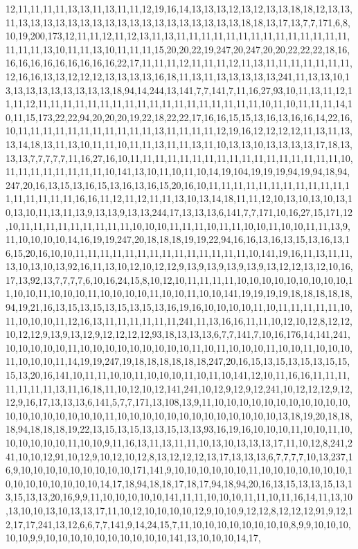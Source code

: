 12,11,11,11,11,13,13,11,13,11,11,12,19,16,14,13,13,13,12,13,12,13,13,18,18,12,13,13,11,13,13,13,13,13,13,13,13,13,13,13,13,13,13,13,13,13,13,18,18,13,17,13,7,7,171,6,8,10,19,200,173,12,11,11,12,11,12,13,11,13,11,11,11,11,11,11,11,11,11,11,11,11,11,11,11,11,11,13,10,11,11,13,10,11,11,11,15,20,20,22,19,247,20,247,20,20,22,22,22,18,16,16,16,16,16,16,16,16,16,16,22,17,11,11,11,12,11,11,11,12,11,13,11,11,11,11,11,11,11,12,16,16,13,13,12,12,12,13,13,13,13,16,18,11,13,11,13,13,13,13,13,241,11,13,13,10,13,13,13,13,13,13,13,13,13,18,94,14,244,13,141,7,7,141,7,11,16,27,93,10,11,13,11,12,11,11,12,11,11,11,11,11,11,11,11,11,11,11,11,11,11,11,11,11,11,10,11,10,11,11,11,14,10,11,15,173,22,22,94,20,20,20,19,22,18,22,22,17,16,16,15,15,13,16,13,16,16,14,22,16,10,11,11,11,11,11,11,11,11,11,11,11,13,11,11,11,11,12,19,16,12,12,12,12,11,13,11,13,13,14,18,13,11,13,10,11,11,10,11,11,13,11,11,13,11,10,13,13,10,13,13,13,13,17,18,13,13,13,7,7,7,7,7,11,16,27,16,10,11,11,11,11,11,11,11,11,11,11,11,11,11,11,11,11,11,10,11,11,11,11,11,11,11,11,10,141,13,10,11,10,11,10,14,19,104,19,19,19,94,19,94,18,94,247,20,16,13,15,13,16,15,13,16,13,16,15,20,16,10,11,11,11,11,11,11,11,11,11,11,11,11,11,11,11,11,11,16,16,11,12,11,12,11,11,13,10,13,14,18,11,11,12,10,13,10,13,10,13,10,13,10,11,13,11,13,9,13,13,9,13,13,244,17,13,13,13,6,141,7,7,171,10,16,27,15,171,12,10,11,11,11,11,11,11,11,11,11,10,10,10,11,11,11,10,11,11,10,10,11,10,10,11,11,13,9,11,10,10,10,10,14,16,19,19,247,20,18,18,18,19,19,22,94,16,16,13,16,13,15,13,16,13,16,15,20,16,10,10,11,11,11,11,11,11,11,11,11,11,11,11,11,11,10,141,19,16,11,13,11,11,13,10,13,10,13,92,16,11,13,10,12,10,12,12,9,13,9,13,9,13,9,13,9,13,12,12,13,12,10,16,17,13,92,13,7,7,7,7,6,10,16,24,15,8,10,12,10,11,11,11,11,10,10,10,10,10,10,10,10,10,11,10,10,11,10,10,10,11,10,10,10,10,11,10,10,11,10,10,141,19,19,19,19,18,18,18,18,18,94,19,21,16,13,15,13,15,13,15,13,15,13,16,19,16,10,10,10,10,11,10,11,11,11,11,11,10,11,10,10,10,11,12,16,13,11,11,11,11,11,11,241,11,13,16,16,11,11,10,12,10,12,8,12,12,10,12,12,9,13,9,13,12,9,12,12,12,12,93,18,13,13,13,6,7,7,141,7,10,16,176,14,141,241,10,10,10,10,10,11,10,10,10,10,10,10,10,10,10,11,10,11,10,10,10,11,10,10,11,10,10,10,11,10,10,10,11,14,19,19,247,19,18,18,18,18,18,18,247,20,16,15,13,15,13,15,13,15,15,15,13,20,16,141,10,11,11,10,10,11,10,10,10,11,10,11,10,141,12,10,11,16,16,11,11,11,11,11,11,11,13,11,16,18,11,10,12,10,12,141,241,10,12,9,12,9,12,241,10,12,12,12,9,12,12,9,16,17,13,13,13,6,141,5,7,7,171,13,108,13,9,11,10,10,10,10,10,10,10,10,10,10,10,10,10,10,10,10,10,10,10,11,10,10,10,10,10,10,10,10,10,10,10,10,10,13,18,19,20,18,18,18,94,18,18,18,19,22,13,15,13,15,13,13,15,13,13,93,16,19,16,10,10,10,11,10,10,11,10,10,10,10,10,10,11,10,10,9,11,16,13,11,13,11,11,10,13,10,13,13,13,17,11,10,12,8,241,241,10,10,12,91,10,12,9,10,12,10,12,8,13,12,12,12,13,17,13,13,13,6,7,7,7,7,10,13,237,16,9,10,10,10,10,10,10,10,10,10,171,141,9,10,10,10,10,10,10,11,10,10,10,10,10,10,10,10,10,10,10,10,10,10,10,14,17,18,94,18,18,17,18,17,94,18,94,20,16,13,15,13,13,15,13,13,15,13,13,20,16,9,9,11,10,10,10,10,10,141,11,11,10,10,10,11,11,10,11,16,14,11,13,10,13,10,10,13,10,13,13,17,11,10,12,10,10,10,10,12,9,10,10,9,12,12,8,12,12,12,91,9,12,12,17,17,241,13,12,6,6,7,7,141,9,14,24,15,7,11,10,10,10,10,10,10,10,10,8,9,9,10,10,10,10,10,9,9,10,10,10,10,10,10,10,10,10,10,141,13,10,10,10,14,17,